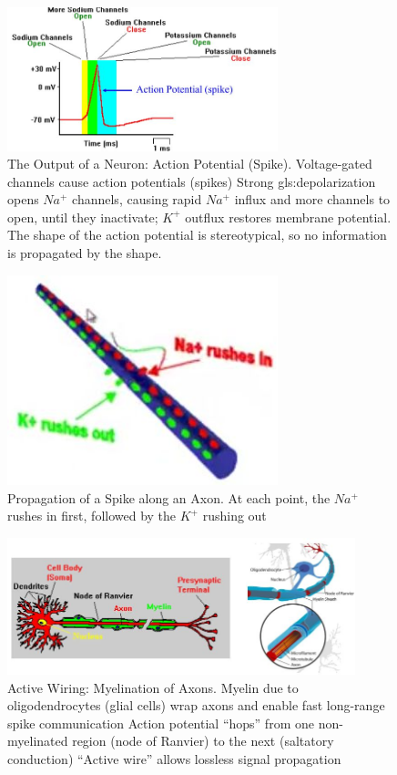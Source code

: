 \documentclass[]{article}
\begin{document}
\begin{figure}[H]
	\caption[The Output of a Neuron: Action Potential (Spike)]{The Output of a Neuron: Action Potential (Spike). Voltage-gated channels cause action potentials (spikes) Strong \gls{gls:depolarization} opens $Na^+$ channels, causing rapid $Na^+$ influx and more channels to open, until they inactivate; $K^+$ outflux restores membrane potential. The shape of the action potential is stereotypical, so no information is propagated by the shape.}
	\includegraphics[width=0.7\textwidth]{action-potential}
\end{figure}

\begin{figure}[H]
	\caption[Propagation of a Spike along an Axon]{Propagation of a Spike along an Axon. At each point, the $Na^+$ rushes in first, followed by the $K^+$ rushing out\cite{krantz2000PsychScholar}}
	\includegraphics[width=0.7\textwidth]{propagation1}
\end{figure}



\begin{figure}[H]
	\caption[Active Wiring: Myelination of Axons]{Active Wiring: Myelination of Axons. Myelin due to oligodendrocytes (glial cells) wrap axons and
		enable fast long-range spike communication
		Action potential “hops” from one non-myelinated region
		(node of Ranvier) to the next (saltatory conduction)
		“Active wire” allows lossless signal propagation}
	\includegraphics[width=0.9\textwidth]{myelination}
\end{figure}
\end{document}
